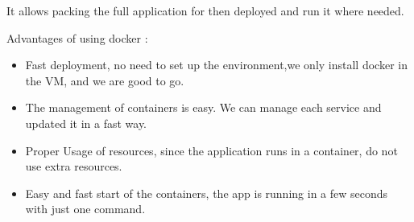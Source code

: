 It allows packing the full application for then deployed and run it where needed. 

Advantages of using docker \cite{dockeradv}:

\begin{itemize}

	\item  Fast deployment, no need to set up the environment,we only install docker in the VM, and we are good to go.
	\item  The management of containers is easy. We can manage each service and updated it in a fast way.
	\item  Proper Usage of resources, since the application runs in a container, do not use extra resources.
	\item  Easy and fast start of the containers, the app is running in a few seconds with just one command.
\end{itemize}
